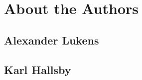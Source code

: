 \chapter{About the Authors}\label{chap:About_Authors}
\section*{Alexander Lukens}\label{sec:Alexander_Lukens}

\section*{Karl Hallsby}\label{sec:Karl_Hallsby}

